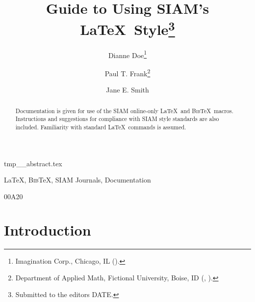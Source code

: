 \documentclass[final,onefignum,onetabnum]{siamonline190516}
\title{Guide to Using SIAM's \LaTeX\ Style\thanks{Submitted to the editors DATE.
\funding{Funding information goes here.}}}
\author{Dianne Doe\thanks{Imagination Corp., Chicago, IL (\email{ddoe@imag.com}).}
\and Paul T. Frank\thanks{Department of Applied Math, Fictional University, Boise, ID (\email{ptfrank@fictional.edu}, \email{jesmith@fictional.edu}).}
\and Jane E. Smith\footnotemark[3]}
\newcommand{\BibTeX}{{\scshape Bib}\TeX\xspace}
\begin{document}
\maketitle

\begin{tcbverbatimwrite}{tmp_\jobname_abstract.tex}
\begin{abstract}
  Documentation is given for use of the SIAM online-only \LaTeX\ and \BibTeX\
  macros.  Instructions and suggestions for compliance with SIAM style
  standards are also included. Familiarity with standard \LaTeX\ commands is assumed.
\end{abstract}

\begin{keywords}
  \LaTeX, \BibTeX, SIAM Journals, Documentation 
\end{keywords}

\begin{AMS}
  00A20 
\end{AMS}
\end{tcbverbatimwrite}


\section{Introduction}
\label{sec:intro}
\end{document}
